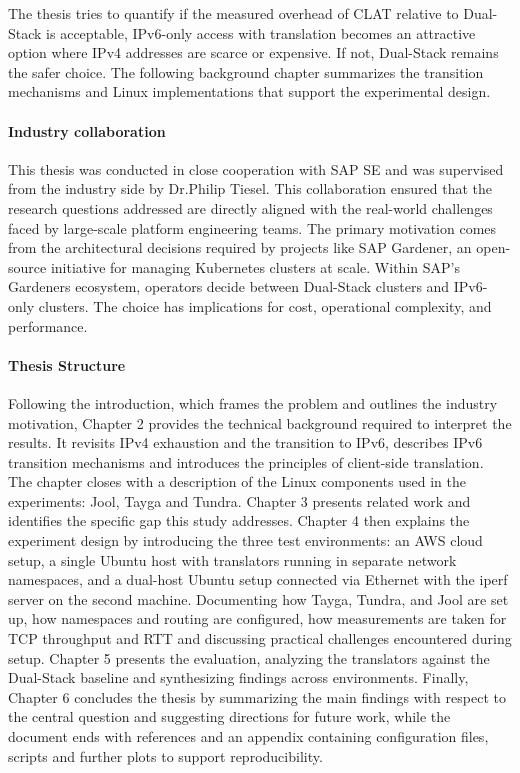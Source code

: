 The thesis tries to quantify if the measured overhead of CLAT relative to Dual-Stack is acceptable, IPv6-only access with translation becomes an attractive option where IPv4 addresses are scarce or expensive. If not, Dual-Stack remains the safer choice. The following background chapter summarizes the transition mechanisms and Linux implementations that support the experimental design\cite{rfc6877, rfc4241}.

\paragraph{Industry collaboration }
This thesis was conducted in close cooperation with SAP SE and was supervised from the industry side by Dr.Philip Tiesel. This collaboration ensured that the research questions addressed are directly aligned with the real-world challenges faced by large-scale platform engineering teams. The primary motivation comes from the architectural decisions required by projects like SAP Gardener, an open-source initiative for managing Kubernetes clusters at scale\cite{gardener_docs}. Within SAP's Gardeners ecosystem, operators decide between Dual-Stack clusters and IPv6-only clusters. The choice has implications for cost, operational complexity, and performance. 



\paragraph{Thesis Structure}
Following the introduction, which frames the problem and outlines the industry motivation, 
Chapter 2 provides the technical background required to interpret the results. It revisits IPv4 exhaustion and the transition to IPv6, 
describes IPv6 transition mechanisms and introduces the principles of client-side translation. 
The chapter closes with a description of the Linux components used in the experiments: Jool, Tayga and Tundra. Chapter 3 presents 
related work and identifies the specific gap this study addresses. 
Chapter 4 then explains the experiment design by introducing the three test environments: an AWS cloud setup, 
a single Ubuntu host with translators running in separate network namespaces, and 
a dual-host Ubuntu setup connected via Ethernet with the iperf server on the second machine. Documenting how Tayga, Tundra, and Jool are set up, 
how namespaces and routing are configured, how measurements are taken for TCP throughput and RTT and discussing practical 
challenges encountered during setup. 
Chapter 5 presents the evaluation, analyzing the translators against the 
Dual-Stack baseline and synthesizing findings across environments. Finally, Chapter 6 
concludes the thesis by summarizing the main findings with respect to the central question and 
suggesting directions for future work, while the document ends with references and an appendix containing configuration files, scripts and 
further plots to support reproducibility.
